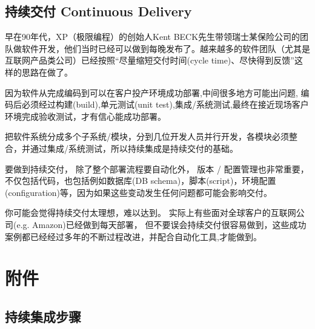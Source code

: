 \hypertarget{ux6301ux7eedux4ea4ux4ed8-continuous-delivery}{%
\subsection{持续交付 Continuous
Delivery}\label{ux6301ux7eedux4ea4ux4ed8-continuous-delivery}}

早在90年代，XP（极限编程）的创始人Kent
BECK先生带领瑞士某保险公司的团队做软件开发，他们当时已经可以做到每晚发布了。越来越多的软件团队（尤其是互联网产品类公司）已经按照``尽量缩短交付时间(cycle
time)、尽快得到反馈''这样的思路在做了。

因为软件从完成编码到可以在客户投产环境成功部署,中间很多地方可能出问题,
编码后必须经过构建(build),单元测试(unit
test),集成/系统测试,最终在接近现场客户环境完成验收测试，才有信心能成功部署。

把软件系统分成多个子系统/模块，分到几位开发人员并行开发，各模块必须整合，并通过集成/系统测试，所以持续集成是持续交付的基础。

要做到持续交付， 除了整个部署流程要自动化外， 版本 /
配置管理也非常重要， 不仅包括代码，也包括例如数据库(DB
schema)，脚本(script)，环境配置(configuration)等，因为如果这些变动发生任何问题都可能会影响交付。

你可能会觉得持续交付太理想，难以达到。
实际上有些面对全球客户的互联网公司(e.g. Amazon)已经做到每天部署，
但不要误会持续交付很容易做到，这些成功案例都已经经过多年的不断过程改进，并配合自动化工具,才能做到。

\hypertarget{ux9644ux4ef6}{%
\section{附件}\label{ux9644ux4ef6}}



\hypertarget{ux6280ux672fux503aux52a1ux4f8bux5b50}{%
\subsection{持续集成步骤}\label{ux6280ux672fux503aux52a1ux4f8bux5b50}}

